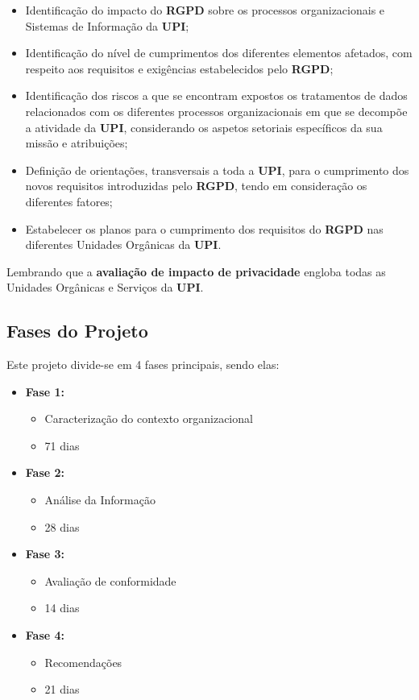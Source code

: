 \begin{itemize}
	\item Identificação do impacto do \textbf{RGPD} sobre os processos organizacionais e Sistemas de Informação da \textbf{UPI};
	\item Identificação do nível de cumprimentos dos diferentes elementos afetados, com respeito aos requisitos e exigências estabelecidos pelo \textbf{RGPD};
	\item Identificação dos riscos a que se encontram expostos os tratamentos de dados relacionados com os diferentes processos organizacionais em que se decompõe a atividade da \textbf{UPI}, considerando os aspetos setoriais específicos da sua missão e atribuições;
	\item Definição de orientações, transversais a toda a \textbf{UPI}, para o cumprimento dos novos requisitos introduzidas pelo \textbf{RGPD}, tendo em consideração os diferentes fatores;
	\item Estabelecer os planos para o cumprimento dos requisitos do \textbf{RGPD} nas diferentes Unidades Orgânicas da \textbf{UPI}.
\end{itemize}

Lembrando que a \textbf{avaliação de impacto de privacidade} engloba todas as Unidades Orgânicas e Serviços da \textbf{UPI}.


\subsection{Fases do Projeto}

Este projeto divide-se em 4 fases principais, sendo elas:


\begin{itemize}
	\item \textbf{Fase 1:}
		\begin{itemize}
			\item Caracterização do contexto organizacional
			\item 71 dias
		\end{itemize}
	\item \textbf{Fase 2:}
		\begin{itemize}
			\item Análise da Informação
			\item 28 dias
		\end{itemize}
	\item \textbf{Fase 3:}
		\begin{itemize}
			\item Avaliação de conformidade
			\item 14 dias
		\end{itemize}
	\item \textbf{Fase 4:}
		\begin{itemize}
			\item Recomendações
			\item 21 dias
		\end{itemize}
\end{itemize}